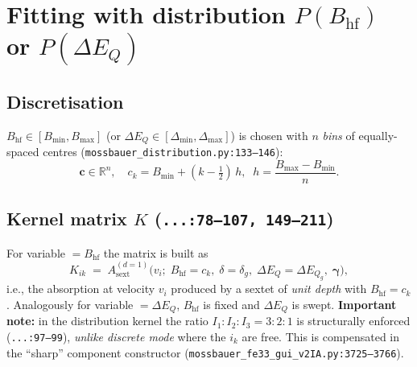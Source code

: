 \documentclass[11pt,a4paper]{article}
\newcommand{\BHF}{B_{\mathrm{hf}}}
\newcommand{\dEQ}{\Delta E_{Q}}
\newcommand{\file}[1]{\textcolor{black!70}{\texttt{\small #1}}}
\begin{document}
\section{Fitting with distribution $P(\BHF)$ or $P(\dEQ)$}\label{sec:dist}

\subsection{Discretisation}
$\BHF\in[B_{\min},B_{\max}]$ (or $\dEQ\in[\Delta_{\min},\Delta_{\max}]$) is chosen with $n$ \emph{bins} of equally-spaced centres (\file{mossbauer\_distribution.py:133--146}):
\begin{equation}
  \bm c \in \mathbb R^{n}, \quad c_k = B_{\min} + (k-\tfrac12)\,h,\;\; h = \frac{B_{\max}-B_{\min}}{n}.
\end{equation}

\subsection{Kernel matrix $K$ (\file{...:78--107, 149--211})}
For variable $=\BHF$ the matrix is built as
\begin{equation}
  K_{ik} \;=\; A_{\text{sext}}^{(d=1)}\bigl(v_i;\;\BHF=c_k,\;\delta=\delta_g,\;\dEQ=\dEQ_g,\;\bm\gamma\bigr),
  \label{eq:Kdef}
\end{equation}
i.e., the absorption at velocity $v_i$ produced by a sextet of \emph{unit depth} with $\BHF=c_k$. Analogously for variable $=\dEQ$, $\BHF$ is fixed and $\dEQ$ is swept. \textbf{Important note:} in the distribution kernel the ratio $I_1{:}I_2{:}I_3 = 3{:}2{:}1$ is structurally enforced (\file{...:97--99}), \emph{unlike discrete mode} where the $i_k$ are free. This is compensated in the ``sharp'' component constructor (\file{mossbauer\_fe33\_gui\_v2IA.py:3725--3766}).
\end{document}
